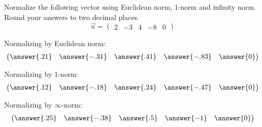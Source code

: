 \documentclass{ximera}
\author{Parisa Fatheddin}
\begin{document}
\begin{exercise}

  Normalize the following vector using Euclidean norm, 1-norm and infinity norm. Round your answers to two decimal places.
  \[
    \vec{u} = \begin{pmatrix} 2 & -3& 4 & -8 & 0\end{pmatrix}
  \]

  \begin{prompt}
    Normalizing by Euclidean norm:
    \[
      \begin{pmatrix}
        \answer{.21} & \answer{-.31} & \answer{.41} & \answer{-.83} & \answer{0}
      \end{pmatrix}
    \]

    Normalizing by 1-norm:
    \[
      \begin{pmatrix}
        \answer{.12} & \answer{-.18} & \answer{.24} & \answer{-.47} & \answer{0}
      \end{pmatrix}
    \]

    Normalizing by $\infty$-norm:
    \[
      \begin{pmatrix}
        \answer{.25} & \answer{-.38} & \answer{.5} & \answer{-1} & \answer{0}
      \end{pmatrix}
    \]
  \end{prompt}
\end{exercise}
\end{document}
